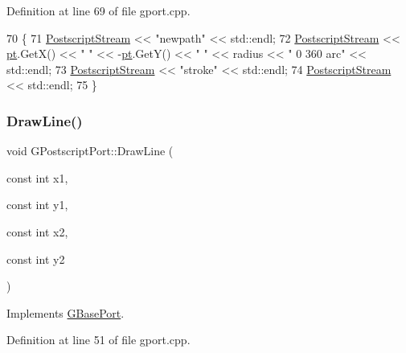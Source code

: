 Definition at line 69 of file gport.\+cpp.


\begin{DoxyCode}
70 \{
71     \mbox{\hyperlink{class_g_postscript_port_a0fb398f1c65b3ccb0efccd509f60d20d}{PostscriptStream}} << \textcolor{stringliteral}{"newpath"} << std::endl;
72     \mbox{\hyperlink{class_g_postscript_port_a0fb398f1c65b3ccb0efccd509f60d20d}{PostscriptStream}} << \mbox{\hyperlink{rings_8cpp_af69bbacaaf68a115b351c5d1e29c3cc8}{pt}}.GetX() << \textcolor{stringliteral}{" "} << -\mbox{\hyperlink{rings_8cpp_af69bbacaaf68a115b351c5d1e29c3cc8}{pt}}.GetY() << \textcolor{stringliteral}{" "} << radius << \textcolor{stringliteral}{" 0 360 arc"}
               << std::endl;
73     \mbox{\hyperlink{class_g_postscript_port_a0fb398f1c65b3ccb0efccd509f60d20d}{PostscriptStream}} << \textcolor{stringliteral}{"stroke"}                                        << std::endl;
74     \mbox{\hyperlink{class_g_postscript_port_a0fb398f1c65b3ccb0efccd509f60d20d}{PostscriptStream}} << std::endl;
75 \}
\end{DoxyCode}
\mbox{\label{class_g_postscript_port_a5f148a471c23fbf49397e17947c426e2}} 
\subsubsection{\texorpdfstring{Draw\+Line()}{DrawLine()}}
{\footnotesize\ttfamily void G\+Postscript\+Port\+::\+Draw\+Line (\begin{DoxyParamCaption}\item[{const int}]{x1,  }\item[{const int}]{y1,  }\item[{const int}]{x2,  }\item[{const int}]{y2 }\end{DoxyParamCaption})\hspace{0.3cm}{\ttfamily [virtual]}}



Implements \mbox{\hyperlink{class_g_base_port_a9e19a5d97e629c3d19be31e1938504c1}{G\+Base\+Port}}.



Definition at line 51 of file gport.\+cpp.


